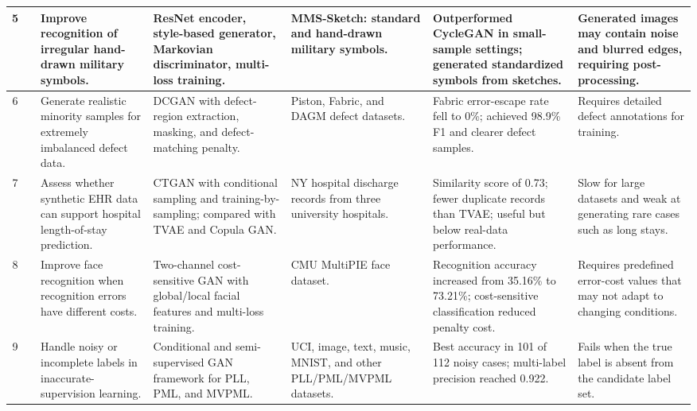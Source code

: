 \documentclass[12pt,a4paper]{article}
\begin{document}
\begin{table}[H]
{\begin{tabular}{|c|p{3.5cm}|p{3.5cm}|p{3.5cm}|p{3.5cm}|p{3.5cm}|p{3.5cm}|}
5 &
\parencite{zuo2023sketched} &
Improve recognition of irregular hand-drawn military symbols. &
ResNet encoder, style-based generator, Markovian discriminator, multi-loss training. &
MMS-Sketch: standard and hand-drawn military symbols. &
Outperformed CycleGAN in small-sample settings; generated standardized symbols from sketches. &
Generated images may contain noise and blurred edges, requiring post-processing.
\\
\hline

6 &
\parencite{li2023eid} &
Generate realistic minority samples for extremely imbalanced defect data. &
DCGAN with defect-region extraction, masking, and defect-matching penalty. &
Piston, Fabric, and DAGM defect datasets. &
Fabric error-escape rate fell to 0\%; achieved 98.9\% F1 and clearer defect samples. &
Requires detailed defect annotations for training.
\\
\hline

7 &
\parencite{bietsch2023electronic} &
Assess whether synthetic EHR data can support hospital length-of-stay prediction. &
CTGAN with conditional sampling and training-by-sampling; compared with TVAE and Copula GAN. &
NY hospital discharge records from three university hospitals. &
Similarity score of 0.73; fewer duplicate records than TVAE; useful but below real-data performance. &
Slow for large datasets and weak at generating rare cases such as long stays.
\\
\hline

8 &
\parencite{chen2020generative} &
Improve face recognition when recognition errors have different costs. &
Two-channel cost-sensitive GAN with global/local facial features and multi-loss training. &
CMU MultiPIE face dataset. &
Recognition accuracy increased from 35.16\% to 73.21\%; cost-sensitive classification reduced penalty cost. &
Requires predefined error-cost values that may not adapt to changing conditions.
\\
\hline

9 &
\parencite{zhang2023inaccurate} &
Handle noisy or incomplete labels in inaccurate-supervision learning. &
Conditional and semi-supervised GAN framework for PLL, PML, and MVPML. &
UCI, image, text, music, MNIST, and other PLL/PML/MVPML datasets. &
Best accuracy in 101 of 112 noisy cases; multi-label precision reached 0.922. &
Fails when the true label is absent from the candidate label set.
\\
\hline

\end{tabular}%
}

\end{table}
\end{document}

